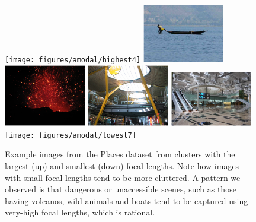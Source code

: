 \begin{figure}
  \centering
    \texttt{[image: figures/amodal/highest4]}
  \includegraphics[width=0.32\textwidth]{figures/amodal/highest3}  
  \includegraphics[width=0.32\textwidth]{figures/amodal/highest6}  
  \includegraphics[width=0.32\textwidth]{figures/amodal/lowest1}
  \includegraphics[width=0.32\textwidth]{figures/amodal/lowest3}  
  \texttt{[image: figures/amodal/lowest7]}
  \caption{ Example images from the Places dataset from clusters with the largest (up) and smallest (down) focal lengths. Note how images with small focal lengths tend to be more cluttered. A pattern we observed is that dangerous or unaccessible scenes, such as those having volcanos, wild animals and boats tend to be captured using very-high focal lengths,  which is rational.}
\end{figure}
